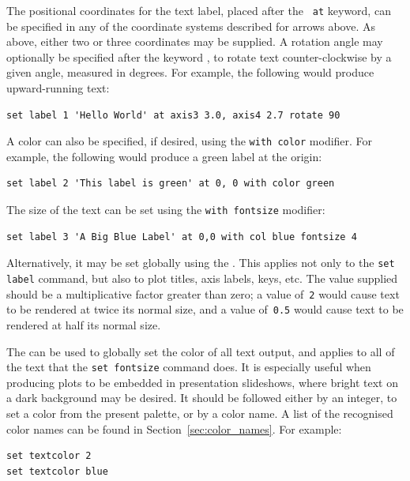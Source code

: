 \noindent The positional coordinates for the text label, placed after the {\tt
at} keyword, can be specified in any of the coordinate systems described for
arrows above. As above, either two or three coordinates may be supplied. A
rotation angle may optionally be specified after the keyword ,
to rotate text counter-clockwise by a given angle, measured in degrees. For
example, the following would produce upward-running text:

\begin{verbatim}
set label 1 'Hello World' at axis3 3.0, axis4 2.7 rotate 90
\end{verbatim}

A color can also be specified, if desired, using the {\tt with color}
modifier.  For example, the following would produce a green label at the origin:

\begin{verbatim}
set label 2 'This label is green' at 0, 0 with color green
\end{verbatim}

 The size of the text can be set using the {\tt with fontsize} modifier:

\begin{verbatim}
set label 3 'A Big Blue Label' at 0,0 with col blue fontsize 4
\end{verbatim}

\noindent
Alternatively, it may be set globally using the . This
applies not only to the {\tt set label} command, but also to plot titles, axis
labels, keys, etc. The value supplied should be a multiplicative factor greater
than zero; a value of~{\tt 2} would cause text to be rendered at twice its
normal size, and a value of~{\tt 0.5} would cause text to be rendered at half
its normal size.

 The  can be
used to globally set the color of all text output, and applies to all of the
text that the {\tt set fontsize} command does. It is especially useful when
producing plots to be embedded in presentation slideshows, where bright text on
a dark background may be desired. It should be followed either by an integer,
to set a color from the present palette, or by a color name. A list of the
recognised color names can be found in Section~\ref{sec:color_names}.  For
example:

\begin{verbatim}
set textcolor 2
set textcolor blue
\end{verbatim}

